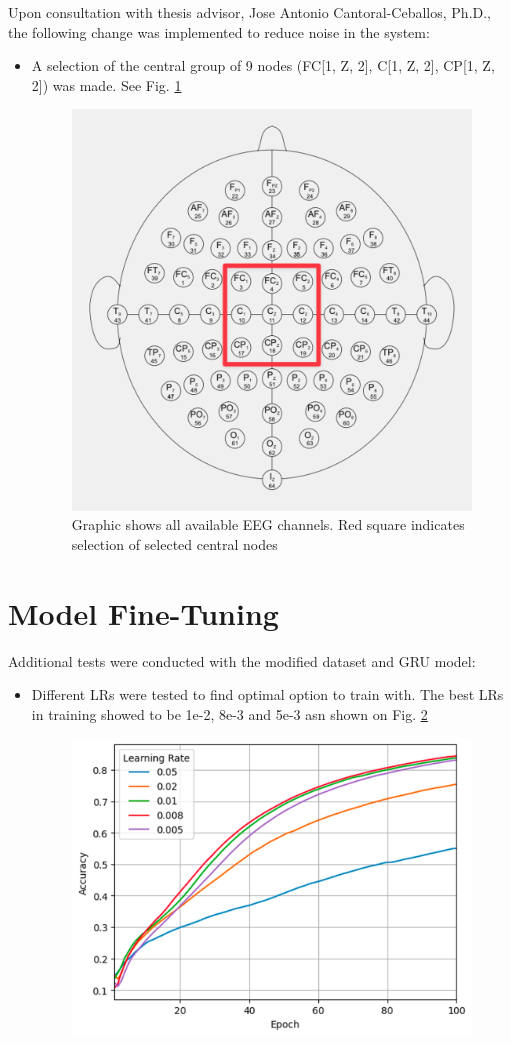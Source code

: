 \documentclass[11pt, a4paper, oneside]{assets/tex/thesis} %
\begin{document}
{Upon consultation with thesis advisor, Jose Antonio Cantoral-Ceballos, Ph.D., the following change was implemented to reduce noise in the system:

\begin{itemize}
    \item A selection of the central group of 9 nodes (FC[1, Z, 2], C[1, Z, 2], CP[1, Z, 2]) was made. See Fig. \ref{fig:eeg_channel_selection}
    \begin{figure}[h]
        \centering
        \includegraphics[width=0.5\linewidth]{assets/img/eeg_channel_selection.png}
        \caption{Graphic shows all available EEG channels. Red square indicates selection of selected central nodes}
        \label{fig:eeg_channel_selection}
    \end{figure}
\end{itemize}

\section{Model Fine-Tuning}

Additional tests were conducted with the modified dataset and GRU model:

\begin{itemize}
    \item Different LRs were tested to find optimal option to train with. The best LRs in training showed to be 1e-2, 8e-3 and 5e-3 asn shown on Fig. \ref{fig:fine_tuning_lr}\\
    \begin{figure}[h]
        \centering
        \includegraphics[width=0.7\linewidth]{assets/img/fine_tuning_lr.png}
        \caption{}
        \label{fig:fine_tuning_lr}
    \end{figure}
    

\end{itemize}}
\end{document}
